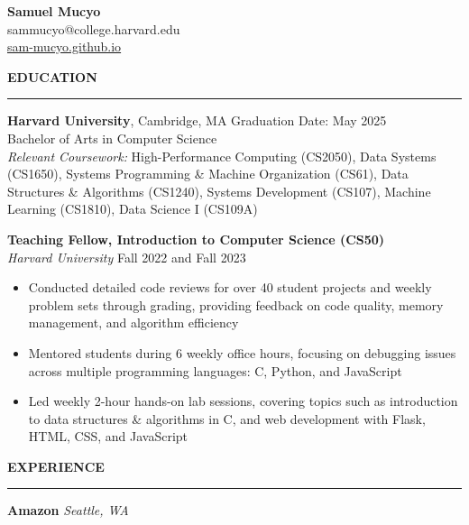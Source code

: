 \documentclass[11pt,a4paper]{article}
\newcommand{\sectionheading}[1]{\vspace{0.2cm}\textbf{\Large #1}\vspace{0.1cm}\hrule\vspace{0.3cm}}
\newcommand{\subheading}[1]{\textbf{#1}}
\newcommand{\daterange}[1]{\hfill{#1}}
\begin{document}
\begin{center}
    \textbf{\LARGE Samuel Mucyo}\\
    \vspace{0.3cm}
    sammucyo@college.harvard.edu \\
    \href{https://sam-mucyo.github.io/}{sam-mucyo.github.io} \\
\end{center}


\sectionheading{EDUCATION}
\subheading{Harvard University}, Cambridge, MA \daterange{Graduation Date: May 2025}\\
Bachelor of Arts in Computer Science\\
\textit{Relevant Coursework:} High-Performance Computing (CS2050), Data Systems (CS1650), Systems Programming \& Machine Organization (CS61), Data Structures \& Algorithms (CS1240), Systems Development (CS107), Machine Learning (CS1810), Data Science I (CS109A)

\medbreak
\subheading{Teaching Fellow, Introduction to Computer Science (CS50)}\\
\textit{Harvard University} \daterange{Fall 2022 and Fall 2023}
\begin{itemize}[leftmargin=*,nosep]
    \item Conducted detailed code reviews for over 40 student projects and weekly problem sets through grading, providing feedback on code quality, memory management, and algorithm efficiency
    \item Mentored students during 6 weekly office hours, focusing on debugging issues across multiple programming languages: C, Python, and JavaScript
    \item Led weekly 2-hour hands-on lab sessions, covering topics such as introduction to data structures \& algorithms in C, and web development with Flask, HTML, CSS, and JavaScript
\end{itemize}

\sectionheading{EXPERIENCE}
\subheading{Amazon} \hfill \textit{Seattle, WA}
\end{document}
